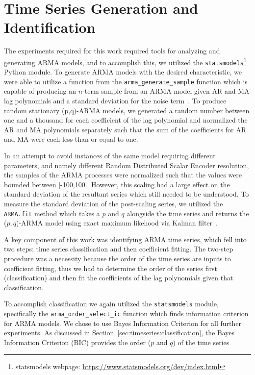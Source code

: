 \documentclass[oneside,12pt,openany]{book}
\begin{document}
	\section{Time Series Generation and Identification}\label{sec:exp:timeseriesclass}
    
    The experiments required for this work required tools for analyzing and generating ARMA models, and to accomplish this, we utilized the \texttt{statsmodels}\footnote{statsmodels webpage: \href{https://www.statsmodels.org/dev/index.html}{https://www.statsmodels.org/dev/index.html}} Python module. To generate ARMA models with the desired characteristic, we were able to utilize a function from the \texttt{arma\_generate\_sample} function which is capable of producing an $n$-term sample from an ARMA model given AR and MA lag polynomials and a standard deviation for the noise term~\cite{statsmodels}. To produce random stationary (p,q)-ARMA models, we generated a random number between one and a thousand for each coefficient of the lag polynomial and normalized the AR and MA polynomials separately such that the sum of the coefficients for AR and MA were each less than or equal to one.
    
    In an attempt to avoid instances of the same model requiring different parameters, and namely different Random Distributed Scalar Encoder resolution, the samples of the ARMA processes were normalized such that the values were bounded between [-100,100]. However, this scaling had a large effect on the standard deviation of the resultant series which still needed to be understood. To measure the standard deviation of the post-scaling series, we utilized the \texttt{ARMA.fit} method which takes a $p$ and $q$ alongside the time series and returns the ($p,q$)-ARMA model using exact maximum likehood via Kalman filter~\cite{statsmodels}. 
    
	A key component of this work was identifying ARMA time series, which fell into two steps: time series classification and then coefficient fitting. The two-step procedure was a necessity because the order of the time series are inputs to coefficient fitting, thus we had to determine the order of the series first (classification) and then fit the coefficients of the lag polynomials given that classification. 
    
    To accomplish classification we again utilized the \texttt{statsmodels} module, specifically the \texttt{arma\_order\_select\_ic} function which finds information criterion for ARMA models. We chose to use Bayes Information Criterion for all further experiments. As discussed in Section~\ref{sec:timeseries:classification}, the Bayes Information Criterion (BIC) provides the order ($p$ and $q$) of the time series
    
\end{document}
